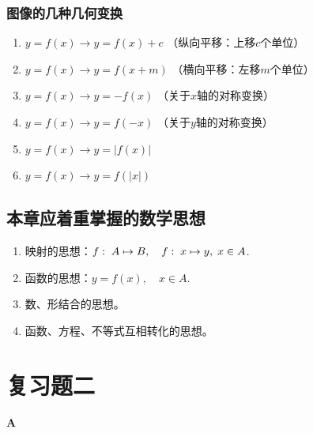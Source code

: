 \subsubsection{图像的几种几何变换}
\begin{enumerate}
    \item $y=f(x)\longrightarrow y=f(x)+c$
   \hfill （纵向平移：上移$c$个单位）
    \item $y=f(x)\longrightarrow y=f(x+m)$
    \hfill   （横向平移：左移$m$个单位）
    \item $y=f(x)\longrightarrow y=-f(x)$
    \hfill   （关于$x$轴的对称变换）
    \item $y=f(x)\longrightarrow y=f(-x)$
    \hfill    （关于$y$轴的对称变换）
    \item $y=f(x)\longrightarrow y=|f(x)|$
    \item $y=f(x)\longrightarrow y=f(|x|)$
\end{enumerate}

\subsection{本章应着重掌握的数学思想}
\begin{enumerate}
\item 映射的思想：$f:\; A\mapsto B,\quad f:\; x\mapsto y,\; x\in A$.
\item 函数的思想：$y=f(x),\quad x\in A$.
\item 数、形结合的思想。
\item 函数、方程、不等式互相转化的思想。
\end{enumerate}

\section*{复习题二}
\begin{center}
    \bfseries A
\end{center}


